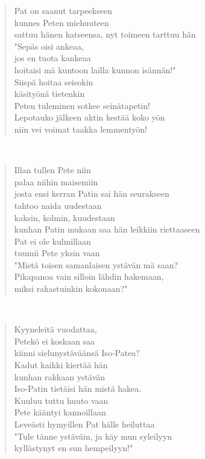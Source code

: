 \noindent\begin{minipage}{\linewidth}
\begin{verse}
	Pat on saanut tarpeekseen\\
	kunnes Peten miehuuteen\\
	sattuu hänen katseensa, nyt toimeen tarttuu hän\\
	"Sepäs oisi ankeaa,\\
	jos en tuota kankeaa\\
	hoitaisi mä kuntoon lailla kunnon isännän!"\\
	Siispä hoitaa seisokin\\
	käsityönä tietenkin\\
	Peten tuleminen sotkee seinätapetin!\\
	Lepotauko jälkeen aktin kestää koko yön\\
	niin vei voimat taakka lemmentyön!\\
\end{verse}
\end{minipage}\\[10pt]
\noindent\begin{minipage}{\linewidth}
\begin{verse}
	Illan tullen Pete niin\\
	palaa niihin maisemiin\\
	josta ensi kerran Patin sai hän seurakseen\\
	tahtoo naida uudestaan\\
	kaksin, kolmin, kuudestaan\\
	kunhan Patin mukaan saa hän leikkiin riettaaseen\\
	Pat ei ole kulmillaan\\
	tuumii Pete yksin vaan\\
	"Mistä toisen samanlaisen ystävän mä saan?\\
	Pikapanoa vain silloin lähdin hakemaan,\\
	miksi rakastuinkin kokonaan?"\\
\end{verse}
\end{minipage}\\[10pt]
\noindent\begin{minipage}{\linewidth}
\begin{verse}
	Kyyneleitä vuodattaa,\\
	Petekö ei koskaan saa\\
	kiinni sielunystäväänsä Iso-Patea?\\
	Kadut kaikki kiertää hän\\
	kunhan rakkaan ystävän\\
	Iso-Patin tietäisi hän mistä hakea.\\
	Kuuluu tuttu huuto vaan\\
	Pete kääntyi kannoillaan\\
	Leveästi hymyillen Pat hälle heiluttaa\\
	"Tule tänne ystäväin, ja käy mun syleilyyn\\
	kyllästynyt en sun hempeilyyn!"\\
\end{verse}
\end{minipage}\\[10pt]
